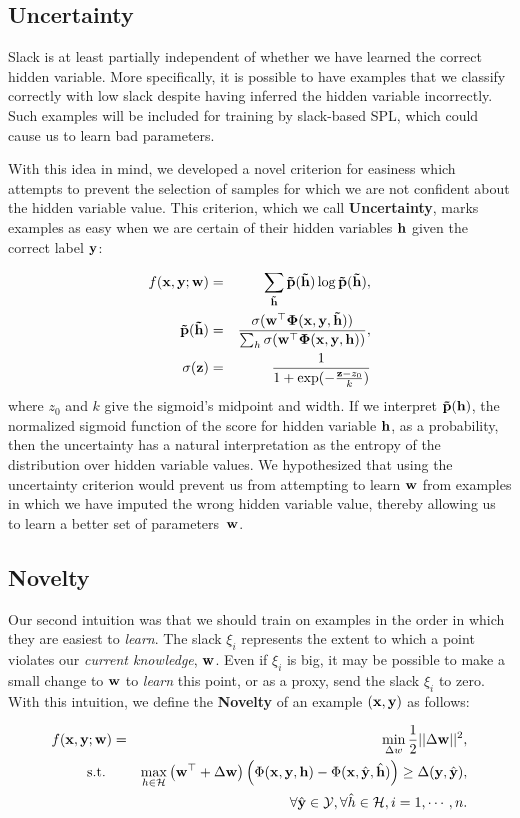 \documentclass{article}
\newcommand{\mysubsection}[1]{\vspace{-3mm}\subsection{#1}\vspace{-3mm}}
\begin{document}
\mysubsection{Uncertainty}

Slack is at least partially independent of whether we have learned the correct hidden variable. More specifically, it is possible to have examples that we classify correctly with low slack despite having inferred the hidden variable incorrectly. Such examples will be included for training by slack-based SPL, which could cause us to learn bad parameters. 

With this idea in mind, we developed a novel criterion for easiness which attempts to prevent the selection of samples for which we are not confident about the hidden variable value. This criterion, which we call \textbf{Uncertainty}, marks examples as easy when we are certain of their hidden variables $\bf h$ given the correct label $\bf y$: 

\begin{eqnarray}
f(\bf x, \bf y; \bf w) &=& \sum_{\bf\tilde{h}} \bf\tilde p({\tilde h}) \log\bf\tilde p(\bf{\tilde h}), \nonumber  \\
\bf{\tilde{p}(\tilde h)} &=&\frac{\sigma(\bf{w}^\top\Phi(\bf x,y, \tilde h))}{\sum_{h}\sigma(\bf w^\top\Phi(\bf x,\bf y,\bf h))}, \nonumber \\
\sigma(\bf z) &=& \frac{1}{1+\exp(-\frac{{\bf z} - z_0}{k})}
\label{eq:uncertainty}
\end{eqnarray}
where $z_0$ and $k$ give the sigmoid's midpoint and width. If we interpret $\bf\tilde p(\bf h)$, the normalized sigmoid function of the score for hidden variable $\bf h$, as a probability, then the uncertainty has a natural interpretation as the entropy of the distribution over hidden variable values. We hypothesized that using the uncertainty criterion would prevent us from attempting to learn $\bf w$ from examples in which we have imputed the wrong hidden variable value, thereby allowing us to learn a better set of parameters~$\bf w$. 

\mysubsection{Novelty}
Our second intuition was that we should train on examples in the order in which they are easiest to \emph{learn}.  The slack $\xi_i$ represents the extent to which a point violates our \emph{current knowledge}, $\bf w$.  Even if $\xi_i$ is big, it may be possible to make a small change to $\bf w$ to \emph{learn} this point, or as a proxy, send the slack $\xi_i$ to zero.  With this intuition, we define the \textbf{Novelty} of an example $(\bf x, \bf y)$ as follows:

\begin{eqnarray}
f(\bf x, \bf y; \bf w) &=&\min_{\Delta w} \frac{1}{2}||{\Delta\bf w}||^2, \nonumber \\
\mbox{s.t. } && \max_{h \in {\cal H}} \left( {\bf w}^\top + \Delta\bf w \right) \left(\Phi({\bf x},{\bf y},{\bf h}) - 
		\Phi({\bf x},\hat{\bf y},\hat{\bf h}) \right)
	 \geq \Delta({\bf y},\hat{\bf y}) , \nonumber \\
&&\forall \hat{\bf y} \in {\cal Y}, \forall \hat{h} \in {\cal H}, i=1,\cdots,n.
\label{eq:novelty}
\end{eqnarray}
\end{document}
